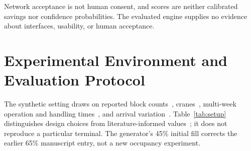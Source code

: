 \documentclass[a4paper]{llncs}
\begin{document}
Network acceptance is not human consent, and scores are neither
calibrated savings nor confidence probabilities. The evaluated engine
supplies no evidence about interfaces, usability, or human acceptance.

\section{Experimental Environment and Evaluation Protocol}
\label{sec:env}
The synthetic setting draws on reported block counts~\cite{ref16},
cranes~\cite{ref8}, multi-week operation and handling times~\cite{ref9},
and arrival variation~\cite{ref13}. Table~\ref{tab:setup} distinguishes
design choices from literature-informed values~\cite{ref20}; it does
not reproduce a particular terminal. The generator's 45\% initial fill
corrects the earlier 65\% manuscript entry, not a new occupancy experiment.
\end{document}
